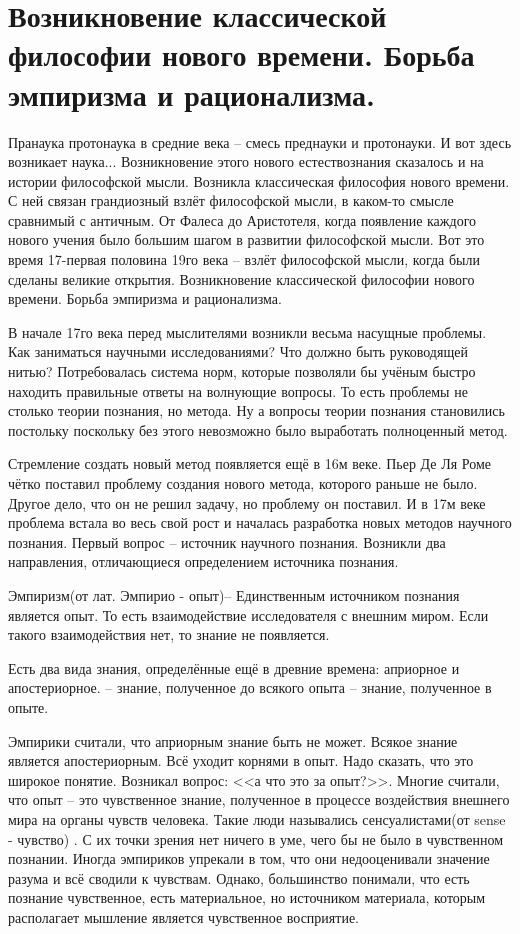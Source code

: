 \section{Возникновение классической философии нового времени. Борьба эмпиризма и рационализма.}


Пранаука протонаука в средние века – смесь преднауки и протонауки. И вот здесь возникает наука... Возникновение этого нового естествознания сказалось и на истории философской мысли. Возникла классическая философия нового времени. С ней связан грандиозный взлёт философской мысли, в каком-то смысле сравнимый с античным. От Фалеса до Аристотеля, когда появление каждого нового учения было большим шагом в развитии философской мысли. Вот это время 17-первая половина 19го века – взлёт философской мысли, когда были сделаны великие открытия.
Возникновение классической философии нового времени. Борьба эмпиризма и рационализма.

В начале 17го века перед мыслителями возникли весьма насущные проблемы. Как заниматься научными исследованиями? Что должно быть руководящей нитью? Потребовалась система норм, которые позволяли бы учёным быстро находить правильные ответы на волнующие вопросы. То есть проблемы не столько теории познания, но метода. Ну а вопросы теории познания становились постольку поскольку без этого невозможно было выработать полноценный метод.

Стремление создать новый метод появляется ещё в 16м веке. Пьер Де Ля Роме чётко поставил проблему создания нового метода, которого раньше не было. Другое дело, что он не решил задачу, но проблему он поставил. И в 17м веке проблема встала во весь свой рост и началась разработка новых методов научного познания. Первый вопрос – источник научного познания. Возникли два направления, отличающиеся определением источника познания.

Эмпиризм(от лат. Эмпирио - опыт)– Единственным источником познания является опыт. То есть взаимодействие исследователя с внешним миром. Если такого взаимодействия нет, то знание не появляется.

Есть два вида знания, определённые ещё в древние времена: априорное и апостериорное. – знание, полученное до всякого опыта – знание, полученное в опыте.

Эмпирики считали, что априорным знание быть не может. Всякое знание является апостериорным. Всё уходит корнями в опыт. Надо сказать, что это широкое понятие. Возникал вопрос: <<а что это за опыт?>>. Многие считали, что опыт – это чувственное знание, полученное в процессе воздействия внешнего мира на органы чувств человека. Такие люди назывались сенсуалистами(от sense - чувство) . С их точки зрения нет ничего в уме, чего бы не было в чувственном познании. Иногда эмпириков упрекали в том, что они недооценивали значение разума и всё сводили к чувствам. Однако, большинство понимали, что есть познание чувственное, есть материальное, но источником материала, которым располагает мышление является чувственное восприятие.

